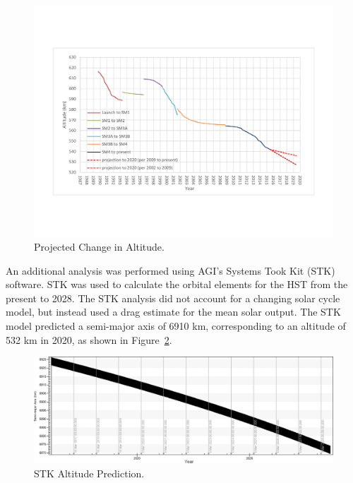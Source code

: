 \documentclass[paper=letter, fontsize=11pt]{scrartcl} %
\numberwithin{equation}{section} %
\numberwithin{figure}{section} %
\numberwithin{table}{section} %
\begin{document}
\begin{figure}[H]
    \begin{center}
        \includegraphics[width=1\textwidth]{figs2/4.pdf}
        \caption{Projected Change in Altitude.}
        \label{fig:fig4}
    \end{center}
\end{figure}

An additional analysis was performed using AGI's Systems Took Kit (STK) software. STK was used to calculate the orbital elements for the HST from the present to 2028. The STK analysis did not account for a changing solar cycle model, but instead used a drag estimate for the mean solar output. The STK model predicted a semi-major axis of 6910 km, corresponding to an altitude of 532 km in 2020, as shown in Figure~\ref{fig:fig5}.

\begin{figure}[H]
    \begin{center}
        \includegraphics[width=1\textwidth]{figs2/5.png}
        \caption{STK Altitude Prediction.}
        \label{fig:fig5}
    \end{center}
\end{figure}
\end{document}
